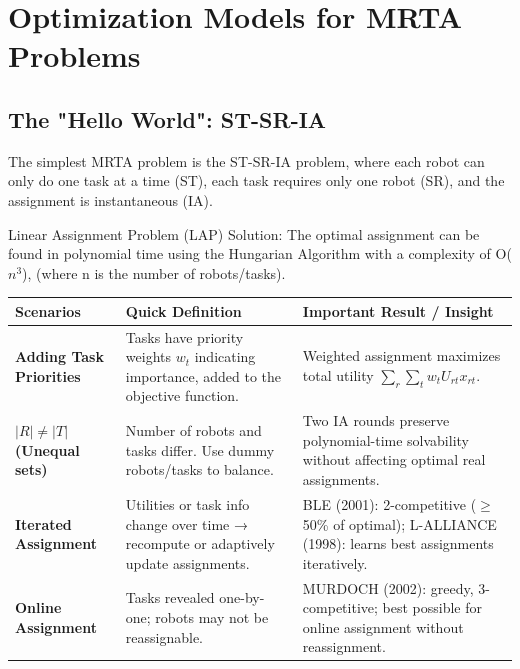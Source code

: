 \section*{Optimization Models for MRTA Problems}

\subsection*{The "Hello World": ST-SR-IA}
The simplest MRTA problem is the ST-SR-IA problem, where each robot can only do one task at a time (ST), each task requires only one robot (SR), and the assignment is instantaneous (IA).

Linear Assignment Problem (LAP) Solution: The optimal assignment can be found in polynomial time using the Hungarian Algorithm with a complexity of O($n^3$), (where n is the number of robots/tasks).

\begin{table}[h!]
\centering
\renewcommand{\arraystretch}{1.2}
\begin{tabularx}{\textwidth}{@{}p{2.5cm}|p{6.7cm}|X@{}}
\toprule
\textbf{Scenarios} & \textbf{Quick Definition} & \textbf{Important Result / Insight} \\ \midrule
\textbf{Adding Task Priorities} & Tasks have priority weights \(w_t\) indicating importance, added to the objective function. & Weighted assignment maximizes total utility \(\sum_r \sum_t w_t U_{rt} x_{rt}\). \\ \addlinespace
\textbf{$|R| \neq |T|$ (Unequal sets)} & Number of robots and tasks differ. Use dummy robots/tasks to balance. & Two IA rounds preserve polynomial-time solvability without affecting optimal real assignments. \\ \addlinespace
\textbf{Iterated Assignment} & Utilities or task info change over time → recompute or adaptively update assignments. & BLE (2001): 2-competitive ($\geq$50\% of optimal); L-ALLIANCE (1998): learns best assignments iteratively. \\ \addlinespace
\textbf{Online Assignment} & Tasks revealed one-by-one; robots may not be reassignable. & MURDOCH (2002): greedy, 3-competitive; best possible for online assignment without reassignment. \\
\bottomrule
\end{tabularx}
\label{tab:st-sr-ia-summary}
\end{table}

